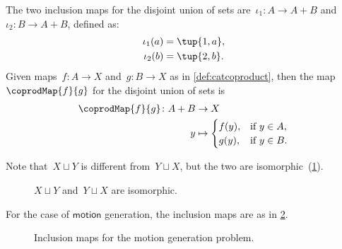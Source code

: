 \begin{example}
The two inclusion maps for the disjoint union of sets are~$\iota_1\colon A \to A + B$ and~$\iota_2\colon B \to A + B$, defined as:
\begin{equation}
\begin{aligned}
    \iota_1(a) &= \tup{1, a},\\
    \iota_2(b) &= \tup{2, b}.
\end{aligned}
\end{equation}
Given maps~$f\colon A\to X$ and~$g\colon B\to X$ as in \cref{def:catcoproduct}, then the map~$\coprodMap{f}{g}$ for the disjoint union of sets is
\begin{equation}
\begin{aligned}
    \coprodMap{f}{g} \colon  A + B &\to X \\
    y &   \mapsto
    \begin{cases}
        f(y), & \text{if } y \in A, \\
        g(y), & \text{if } y \in B.
    \end{cases}
\end{aligned}
\end{equation}
\end{example}
Note that~$X \sqcup Y$ is different from~$Y \sqcup X$, but the two are isomorphic~(\cref{fig:e16}).

\begin{figure}[h!]
    \centering
    \caption{$X \sqcup Y$ and~$Y \sqcup X$ are isomorphic. \label{fig:e16}}
\end{figure}
For the case of $\mathsf{motion}$ generation, the inclusion maps are as in \cref{fig:inclusiongas}.

\begin{figure}[h!]
    \centering
    \caption{Inclusion maps for the motion generation problem. \label{fig:inclusiongas}}
\end{figure}
